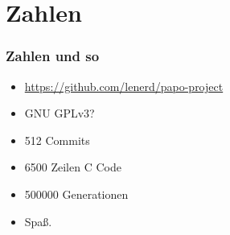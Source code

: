\section*{Zahlen}

\begin{frame}
    \frametitle{Zahlen und so}

    \begin{itemize}
        \item \url{https://github.com/lenerd/papo-project}
        \item GNU GPLv3?
        \item \num{512} Commits
        \item \num{6500} Zeilen C Code
        \item \num{500000} Generationen
        \item Spaß.
    \end{itemize}
\end{frame}
